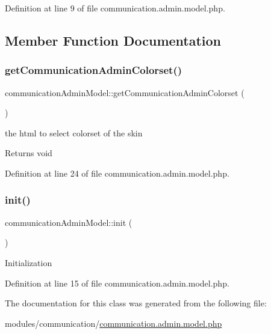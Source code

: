 Definition at line 9 of file communication.\+admin.\+model.\+php.



\subsection{Member Function Documentation}
\mbox{\label{classcommunicationAdminModel_ade2f9d20f5902304d38999095261c827}} 
\subsubsection{\texorpdfstring{get\+Communication\+Admin\+Colorset()}{getCommunicationAdminColorset()}}
{\footnotesize\ttfamily communication\+Admin\+Model\+::get\+Communication\+Admin\+Colorset (\begin{DoxyParamCaption}{ }\end{DoxyParamCaption})}

the html to select colorset of the skin \begin{DoxyReturn}{Returns}
void 
\end{DoxyReturn}


Definition at line 24 of file communication.\+admin.\+model.\+php.

\mbox{\label{classcommunicationAdminModel_a4e1331e1b2ae7131c7466d3eaf1f86f0}} 
\subsubsection{\texorpdfstring{init()}{init()}}
{\footnotesize\ttfamily communication\+Admin\+Model\+::init (\begin{DoxyParamCaption}{ }\end{DoxyParamCaption})}

Initialization 

Definition at line 15 of file communication.\+admin.\+model.\+php.



The documentation for this class was generated from the following file\+:\begin{DoxyCompactItemize}
\item 
modules/communication/\hyperlink{communication_8admin_8model_8php}{communication.\+admin.\+model.\+php}\end{DoxyCompactItemize}

